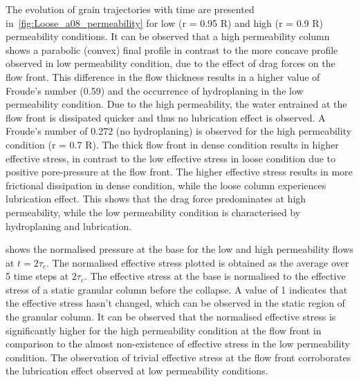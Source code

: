 The evolution of grain trajectories with time are presented 
in~\cref{fig:Loose_a08_permeability} for low (r = 0.95 R) and high (r = 0.9 R)
permeability conditions. It can be observed that a high 
permeability column shows a parabolic (convex) final profile in contrast to the 
more concave profile observed in low permeability condition, due to the effect 
of drag forces on the flow front. This difference in the flow thickness results 
in a higher value of Froude's number (0.59) and the occurrence of hydroplaning 
in the low permeability condition. Due to the high permeability, the water 
entrained at the flow front is dissipated quicker and 
thus no lubrication effect is observed. A Froude's number of 0.272 (no 
hydroplaning) is observed for the high permeability condition (r = 0.7 R). The 
thick flow front in dense condition results in higher effective stress, in 
contrast to the low effective stress in loose condition due to positive 
pore-pressure at the flow front. The higher effective stress results in more 
frictional dissipation in dense condition, while the loose column experiences
lubrication effect. This shows that the drag force predominates at high 
permeability, while the low permeability condition is characterised by 
hydroplaning and lubrication.

 shows the normalised pressure at the 
base for the low and high permeability flows at $ t = 2\tau_c$. The normalised 
effective stress plotted is obtained as the average over 5 time steps at 
$2\tau_c$. The effective stress at the base is normalised to the effective 
stress of a static granular column before the collapse. A value of 1 indicates 
that the effective stress hasn't changed, which can be observed in the static 
region of the granular column. It can be observed that the normalised effective 
stress is significantly higher for the high permeability condition at the flow 
front in comparison to the almost non-existence of effective stress in the low 
permeability condition. The observation of trivial effective stress at the flow 
front corroborates the lubrication effect observed at low permeability 
conditions.

